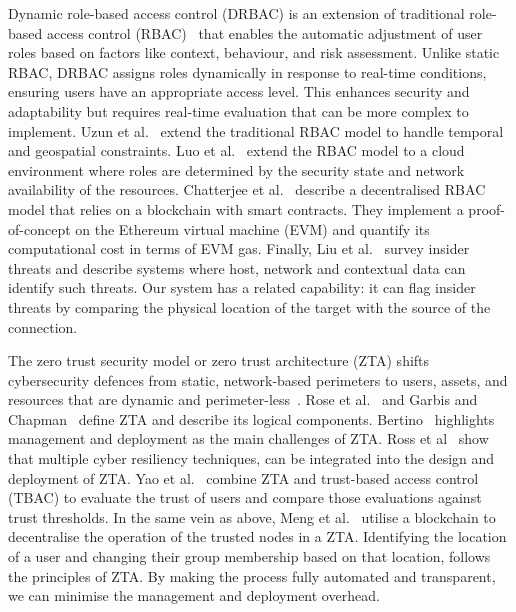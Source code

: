 Dynamic role-based access control (DRBAC) is an extension of
traditional role-based access control
(RBAC)~\cite{franqueira-wieringa-12} that enables the automatic
adjustment of user roles based on factors like context, behaviour, and
risk assessment.  Unlike static RBAC, DRBAC assigns roles dynamically
in response to real-time conditions, ensuring users have an
appropriate access level.  This enhances security and adaptability but
requires real-time evaluation that can be more complex to implement.
Uzun et al.~\cite{uzun-et-al-12} extend the traditional RBAC model to
handle temporal and geospatial constraints.  Luo et
al.~\cite{luo-et-al-16} extend the RBAC model to a cloud environment
where roles are determined by the security state and network
availability of the resources.  Chatterjee et
al.~\cite{chatterjee-et-al-20} describe a decentralised RBAC model
that relies on a blockchain with smart contracts.  They implement a
proof-of-concept on the Ethereum virtual machine (EVM) and quantify
its computational cost in terms of EVM gas.  Finally, Liu et
al.~\cite{liu-et-al-18} survey insider threats and describe systems
where host, network and contextual data can identify such threats.
Our system has a related capability: it can flag insider threats by
comparing the physical location of the target with the source of the
connection.

The zero trust security model or zero trust architecture (ZTA) shifts
cybersecurity defences from static, network-based perimeters to users,
assets, and resources that are dynamic and
perimeter-less~\cite{syed-et-al-22}.  Rose et al.~\cite{rose-et-al-20}
and Garbis and Chapman~\cite{garbis-chapman-21} define ZTA and
describe its logical components.  Bertino~\cite{bertino-21} highlights
management and deployment as the main challenges of ZTA.  Ross et
al~\cite{ross-et-al-21} show that multiple cyber resiliency
techniques, can be integrated into the design and deployment of ZTA.
Yao et al.~\cite{yao-et-al-21} combine ZTA and trust-based access
control (TBAC) to evaluate the trust of users and compare those
evaluations against trust thresholds.  In the same vein as above, Meng
et al.~\cite{meng-et-al-22} utilise a blockchain to decentralise the
operation of the trusted nodes in a ZTA.  Identifying the location of
a user and changing their group membership based on that location,
follows the principles of ZTA.  By making the process fully automated
and transparent, we can minimise the management and deployment
overhead.
